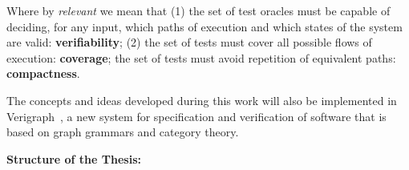 Where by \emph{relevant} we mean that (1) the set of test oracles must be capable of deciding, for any input, which paths of execution and which states of the system are valid: \textbf{verifiability}; (2) the set of tests must cover all possible flows of execution: \textbf{coverage}; the set of tests must avoid repetition of equivalent paths: \textbf{compactness}.

The concepts and ideas developed during this work will also be implemented in Verigraph~\cite{verigraph,Costa2016}, a new system for specification and verification of software that is based on graph grammars and category theory.



\hfill \break
\textbf{Structure of the Thesis:}

